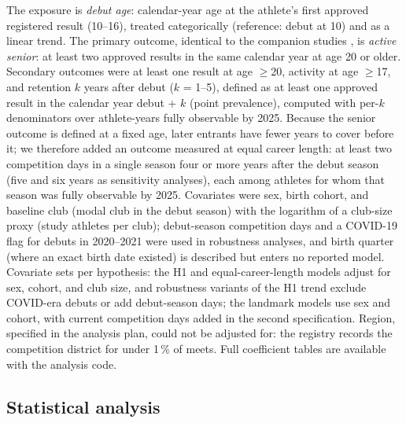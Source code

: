 \documentclass[12pt,a4paper]{article}
\begin{document}
The exposure is \emph{debut age}: calendar-year age at the athlete's first approved registered result (10--16), treated categorically (reference: debut at 10) and as a linear trend. The primary outcome, identical to the companion studies \cite{guttormsen2026dropout,guttormsen2026progression}, is \emph{active senior}: at least two approved results in the same calendar year at age 20 or older. Secondary outcomes were at least one result at age $\geq$20, activity at age $\geq$17, and retention $k$ years after debut ($k$ = 1--5), defined as at least one approved result in the calendar year debut + $k$ (point prevalence), computed with per-$k$ denominators over athlete-years fully observable by 2025. Because the senior outcome is defined at a fixed age, later entrants have fewer years to cover before it; we therefore added an outcome measured at equal career length: at least two competition days in a single season four or more years after the debut season (five and six years as sensitivity analyses), each among athletes for whom that season was fully observable by 2025. Covariates were sex, birth cohort, and baseline club (modal club in the debut season) with the logarithm of a club-size proxy (study athletes per club); debut-season competition days and a COVID-19 flag for debuts in 2020--2021 were used in robustness analyses, and birth quarter (where an exact birth date existed) is described but enters no reported model. Covariate sets per hypothesis: the H1 and equal-career-length models adjust for sex, cohort, and club size, and robustness variants of the H1 trend exclude COVID-era debuts or add debut-season days; the landmark models use sex and cohort, with current competition days added in the second specification. Region, specified in the analysis plan, could not be adjusted for: the registry records the competition district for under 1\,\% of meets. Full coefficient tables are available with the analysis code.

\subsection{Statistical analysis}
\end{document}
